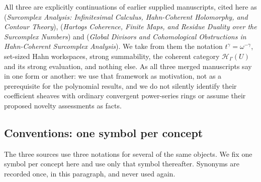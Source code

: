 \documentclass[11pt,letterpaper]{article}
\numberwithin{equation}{section}
\theoremstyle{definition}
\theoremstyle{remark}\newtheorem{remark}[theorem]{Remark}
\newcommand{\HH}{\mathscr H_\Gamma}
\begin{document}
All three are explicitly continuations of earlier supplied manuscripts, cited
here as \cite{polynomial:SourceAnalysis} (\emph{Surcomplex Analysis:
Infinitesimal Calculus, Hahn-Coherent Holomorphy, and Contour Theory}),
\cite{polynomial:SourceResearch} (\emph{Hartogs Coherence, Finite Maps, and
Residue Duality over the Surcomplex Numbers}) and
\cite{polynomial:SourceGlobal} (\emph{Global Divisors and Cohomological
Obstructions in Hahn-Coherent Surcomplex Analysis}). We take from them the
notation $t^\gamma=\omega^{-\gamma}$, set-sized Hahn workspaces, strong
summability, the coherent category $\HH(U)$ and its strong evaluation, and
nothing else. As all three merged manuscripts say in one form or another: we
use that framework as motivation, not as a prerequisite for the polynomial
results, and we do not silently identify their coefficient sheaves with
ordinary convergent power-series rings or assume their proposed novelty
assessments as facts.

\subsection{Conventions: one symbol per concept}\label{polynomial:subsec:conventions}
The three sources use three notations for several of the same objects. We fix
one symbol per concept here and use only that symbol thereafter. Synonyms are
recorded once, in this paragraph, and never used again.
\end{document}
